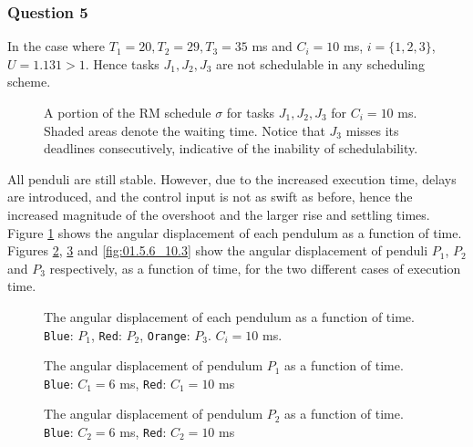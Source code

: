 \subsubsection{Question 5}
In the case where $T_1 = 20, T_2 = 29, T_3 = 35$ ms and $C_i = 10$ ms,
$i=\{1,2,3\}$, $U=1.131 > 1$. Hence tasks $J_1, J_2, J_3$ are not schedulable
in any scheduling scheme.


\begin{figure}[H]\centering
  \scalebox{0.7}{}
  \caption{A portion of the RM schedule $\sigma$ for tasks $J_1, J_2, J_3$ for
    $C_i = 10$ ms.  Shaded areas denote the waiting time. Notice that $J_3$
    misses its deadlines consecutively, indicative of the inability of
    schedulability.}
\end{figure}

All penduli are still stable. However, due to the increased execution time,
delays are introduced, and the control input is not as swift as before,
hence the increased magnitude of the overshoot and the larger rise and settling
times.  Figure \ref{fig:01.5.2} shows the angular displacement of each pendulum
as a function of time.
Figures \ref{fig:01.5.6_10.1}, \ref{fig:01.5.6_10.2} and \ref{fig:01.5.6_10.3}
show the angular displacement of penduli $P_1$, $P_2$ and $P_3$ respectively, as
a function of time, for the two different cases of execution time.

\begin{figure}[H]\centering
  \scalebox{1}{}
  \caption{The angular displacement of each pendulum as a function of time.
    \texttt{Blue}: $P_1$, \texttt{Red}: $P_2$, \texttt{Orange}: $P_3$.
    $C_i = 10$ ms.}
  \label{fig:01.5.2}
\end{figure}

\begin{figure}[H]\centering
  \scalebox{1}{}
  \caption{The angular displacement of pendulum $P_1$ as a function of time.
    \texttt{Blue}: $C_1 = 6$ ms, \texttt{Red}: $C_1 = 10$ ms}
  \label{fig:01.5.6_10.1}
\end{figure}

\begin{figure}[H]\centering
  \scalebox{1}{}
  \caption{The angular displacement of pendulum $P_2$ as a function of time.
    \texttt{Blue}: $C_2 = 6$ ms, \texttt{Red}: $C_2 = 10$ ms}
  \label{fig:01.5.6_10.2}
\end{figure}

